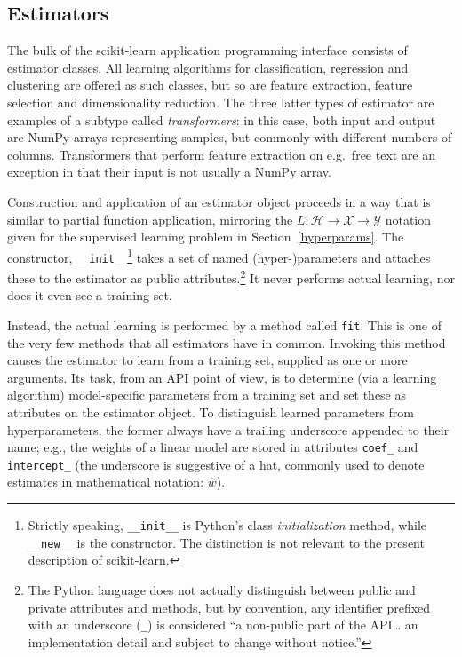 \documentclass[a4paper,twocolumn]{article}
\begin{document}
\subsection{Estimators}


The bulk of the scikit-learn application programming interface
consists of estimator classes.
All learning algorithms for classification, regression and clustering
are offered as such classes,
but so are feature extraction, feature selection and dimensionality reduction.
The three latter types of estimator are examples of a subtype
called \textit{transformers}:
in this case, both input and output are NumPy arrays representing samples,
but commonly with different numbers of columns.
Transformers that perform feature extraction on e.g.\ free text
are an exception in that their input is not usually a NumPy array.

Construction and application of an estimator object
proceeds in a way that is similar to partial function application,
mirroring the $L : \mathcal{H} \to \mathcal{X} \to \mathcal{Y}$ notation
given for the supervised learning problem in Section~\ref{hyperparams}.
The constructor, \texttt{\_\_init\_\_}\footnote{
  Strictly speaking, \texttt{\_\_init\_\_} is Python's
  class \textit{initialization} method,
  while \texttt{\_\_new\_\_} is the constructor.
  The distinction is not relevant to the present description of scikit-learn.}
takes a set of named (hyper-)parameters
and attaches these to the estimator as public attributes.\footnote{
  The Python language does not actually distinguish between public and private
  attributes and methods,
  but by convention, any identifier prefixed with an underscore (\texttt{\_})
  is considered ``a non-public part of the API\ldots
  an implementation detail and subject to change without notice.''
  }
It never performs actual learning, nor does it even see a training set.

Instead, the actual learning is performed by a method called \texttt{fit}.
This is one of the very few methods that all estimators have in common.
Invoking this method causes the estimator to learn from a training set,
supplied as one or more arguments.
Its task, from an API point of view,
is to determine (via a learning algorithm) model-specific parameters
from a training set and set these as attributes on the estimator object.
To distinguish learned parameters from hyperparameters,
the former always have a trailing underscore appended to their name;
e.g., the weights of a linear model are stored in attributes
\texttt{coef\_} and \texttt{intercept\_}
(the underscore is suggestive of a hat,
commonly used to denote estimates in mathematical notation: $\hat{w}$).
\end{document}
